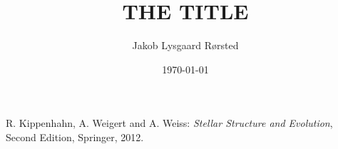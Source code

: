 \documentclass[a4paper, oneside, 11pt, article]{memoir}
\author{Jakob Lysgaard Rørsted}
\title{THE TITLE}
\date{\today}
\begin{document}
\maketitle


%
%
\begin{thebibliography}{9}
 R. Kippenhahn, A. Weigert and A. Weiss: \textsl{Stellar
    Structure and Evolution}, Second Edition, Springer, 2012.
\end{thebibliography}
\end{document}
